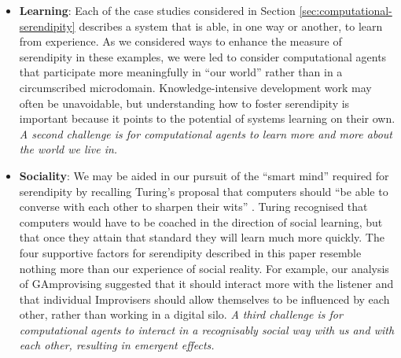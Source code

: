 \begin{itemize}
\item \textbf{Learning}: Each of the case studies considered in
  Section \ref{sec:computational-serendipity} describes a system that
  is able, in one way or another, to learn from experience.  As we
  considered ways to enhance the measure of serendipity in these
  examples, we were led to consider computational agents that
  participate more meaningfully in ``our world'' rather than in a
  circumscribed microdomain.  Knowledge-intensive development work may
  often be unavoidable, but understanding how to foster serendipity is
  important because it points to the potential of systems learning on
  their own.  \emph{A second challenge is for computational agents to
    learn more and more about the world we live in.}
\end{itemize}

\begin{itemize}
\item \textbf{Sociality}: We may be aided in our pursuit of the
  ``smart mind'' required for serendipity by recalling Turing's
  proposal that computers should ``be able to converse with each other
  to sharpen their wits'' \cite{turing-intelligent}.  Turing
  recognised that computers would have to be coached in the direction
  of social learning, but that once they attain that standard they
  will learn much more quickly.  The four supportive factors for
  serendipity described in this paper resemble nothing more than our
  experience of social reality.  For example, our analysis of {\sf
    GAmprovising} suggested that it should interact more with the
  listener and that individual Improvisers should allow
  themselves to be influenced by each other, rather than working in a
  digital silo.  \emph{A third challenge is for computational agents
    to interact in a recognisably social way with us and with each
    other, resulting in emergent effects.}
\end{itemize}

